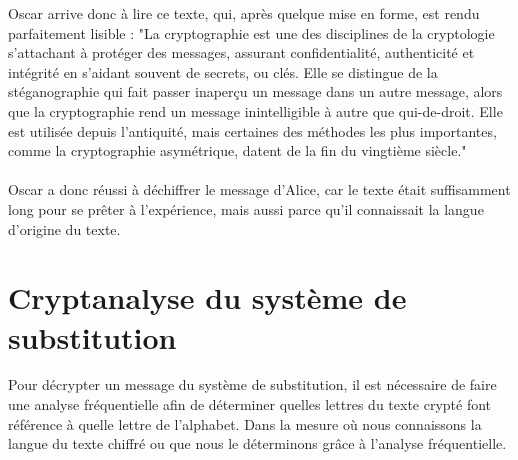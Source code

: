 		Oscar arrive donc à lire ce texte, qui, après quelque mise en forme, est rendu parfaitement lisible :
		"La cryptographie est une des disciplines de la cryptologie s’attachant à protéger des messages, assurant confidentialité, authenticité et intégrité en s’aidant souvent de secrets, ou clés.
		Elle se distingue de la stéganographie qui fait passer inaperçu un message dans un autre message, alors que la cryptographie rend un message inintelligible à autre que qui-de-droit.
		Elle est utilisée depuis l’antiquité, mais certaines des méthodes les plus importantes, comme la cryptographie asymétrique, datent de la fin du vingtième siècle."\\
		\\
		Oscar a donc réussi à déchiffrer le message d'Alice, car le texte était suffisamment long pour se prêter à l'expérience, mais aussi parce qu'il connaissait la langue d'origine du texte.
	\section{Cryptanalyse du système de substitution}
		Pour décrypter un message du système de substitution, il est 
		nécessaire de faire une analyse fréquentielle afin de déterminer
		quelles lettres du texte crypté font référence à quelle lettre de l'alphabet. Dans la mesure où nous connaissons la langue du texte chiffré ou que nous le déterminons grâce à l'analyse fréquentielle.  
		
